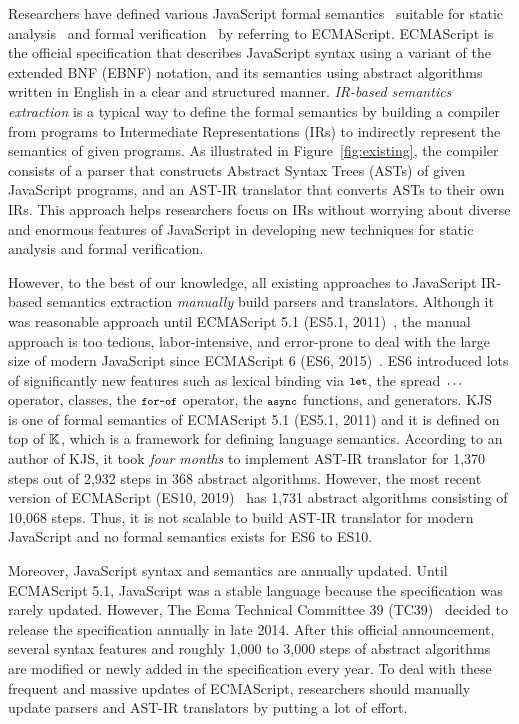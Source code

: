 Researchers have defined various JavaScript formal
semantics~\cite{aplas08,lambdajs,kjs,javert} suitable for static
analysis~\cite{jsai,tajs,wala,safe} and formal verification~\cite{javert} by
referring to ECMAScript.  ECMAScript is the official specification that
describes JavaScript syntax using a variant of the extended BNF (EBNF) notation,
and its semantics using abstract algorithms written in English in a clear and
structured manner.  \textit{IR-based semantics extraction} is a typical way to
define the formal semantics by building a compiler from programs to Intermediate
Representations (IRs) to indirectly represent the semantics of given programs.
As illustrated in Figure~\ref{fig:existing}, the compiler consists of a parser
that constructs Abstract Syntax Trees (ASTs) of given JavaScript programs, and
an AST-IR translator that converts ASTs to their own IRs.  This approach helps
researchers focus on IRs without worrying about diverse and enormous features of
JavaScript in developing new techniques for static analysis and formal
verification.

However, to the best of our knowledge, all existing approaches to JavaScript
IR-based semantics extraction \textit{manually} build parsers and translators.
Although it was reasonable approach until ECMAScript 5.1 (ES5.1,
2011)~\cite{es5}, the manual approach is too tedious, labor-intensive, and
error-prone to deal with the large size of modern JavaScript since ECMAScript 6
(ES6, 2015)~\cite{es6}. ES6 introduced lots of significantly new features such
as lexical binding via \( \texttt{\footnotesize let} \), the spread \( \texttt{\footnotesize...} \) operator,
classes, the \( \texttt{\footnotesize for-of} \) operator, the \( \texttt{\footnotesize async} \) functions, and
generators.  KJS~\cite{kjs} is one of formal semantics of ECMAScript 5.1 (ES5.1,
2011) and it is defined on top of \( \mathbb{K} \), which is a framework for
defining language semantics.  According to an author of KJS, it took
\textit{four months} to implement AST-IR translator for 1,370 steps out of 2,932
steps in 368 abstract algorithms. However, the most recent version of ECMAScript
(ES10, 2019)~\cite{es10} has 1,731 abstract algorithms consisting of 10,068
steps. Thus, it is not scalable to build AST-IR translator for modern JavaScript
and no formal semantics exists for ES6 to ES10.

Moreover, JavaScript syntax and semantics are annually updated.  Until
ECMAScript 5.1, JavaScript was a stable language because the specification was
rarely updated.  However, The Ecma Technical Committee 39 (TC39)~\cite{tc39}
decided to release the specification annually in late 2014.  After this official
announcement, several syntax features and roughly 1,000 to 3,000 steps of
abstract algorithms are modified or newly added in the specification every year.
To deal with these frequent and massive updates of ECMAScript, researchers
should manually update parsers and AST-IR translators by putting a lot of
effort.

